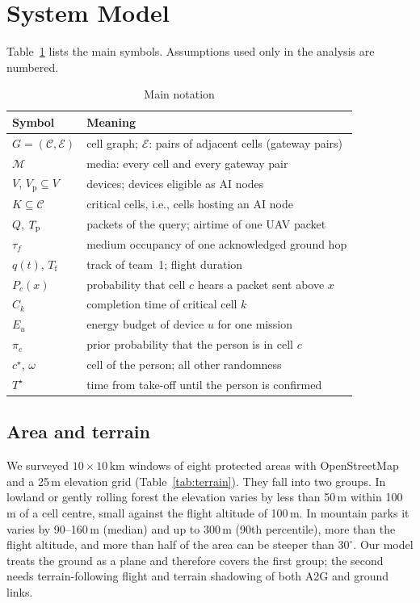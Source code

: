 \section{System Model}\label{sec:model}
Table~\ref{tab:notation} lists the main symbols. Assumptions used only in the analysis are numbered.

\begin{table}[t]\centering
\caption{Main notation}\label{tab:notation}
\footnotesize
\begin{tabular}{@{}ll@{}}
\toprule
Symbol & Meaning\\
\midrule
$G=(\mathcal C,\mathcal E)$ & cell graph; $\mathcal E$: pairs of adjacent cells (gateway pairs)\\
$\mathcal M$ & media: every cell and every gateway pair\\
$V$, $V_{\mathrm p}\subseteq V$ & devices; devices eligible as AI nodes\\
$K\subseteq\mathcal C$ & critical cells, i.e., cells hosting an AI node\\
$Q$, $T_{\mathrm p}$ & packets of the query; airtime of one UAV packet\\
$\tau_f$ & medium occupancy of one acknowledged ground hop\\
$q(t)$, $T_{\mathrm f}$ & track of team~1; flight duration\\
$P_c(x)$ & probability that cell $c$ hears a packet sent above $x$\\
$C_k$ & completion time of critical cell $k$\\
$E_u$ & energy budget of device $u$ for one mission\\
$\pi_c$ & prior probability that the person is in cell $c$\\
$c^\star$, $\omega$ & cell of the person; all other randomness\\
$T^\star$ & time from take-off until the person is confirmed\\
\bottomrule
\end{tabular}
\end{table}

\subsection{Area and terrain}
We surveyed $10\times10$\,km windows of eight protected areas with OpenStreetMap and a 25\,m elevation grid
(Table~\ref{tab:terrain}). They fall into two groups. In lowland or gently rolling forest the elevation varies by less
than 50\,m within 100\,m of a cell centre, small against the flight altitude of 100\,m. In mountain parks it varies by
90--160\,m (median) and up to 300\,m (90th percentile), more than the flight altitude, and more than half of the area
can be steeper than $30^\circ$. Our model treats the ground as a plane and therefore covers the first group; the second
needs terrain-following flight and terrain shadowing of both A2G and ground links.

